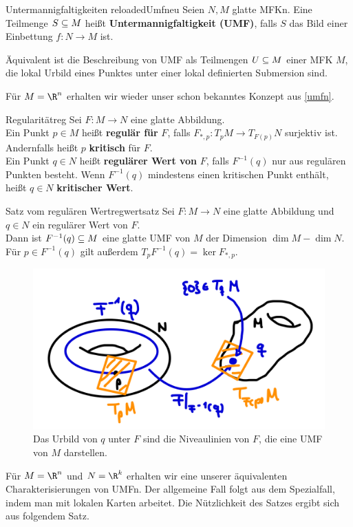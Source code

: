 \begin{definition}{Untermannigfaltigkeiten reloaded}{Umfneu}
Seien $N, M$ glatte MFKn. Eine Teilmenge $S \subseteq M$ heißt \textbf{Untermannigfaltigkeit (UMF)}, falls $S$ das Bild einer Einbettung $f: N \to M$ ist.
\end{definition}
\begin{bemerkung}
Äquivalent ist die Beschreibung von UMF als Teilmengen $U \subseteq M$ einer MFK $M$, die lokal Urbild eines Punktes unter einer lokal definierten Submersion sind.
\end{bemerkung}
Für $M=\R^n$ erhalten wir wieder unser schon bekanntes Konzept aus \ref{umfn}.
\begin{definition}{Regularität}{reg}
Sei $F: M \to N$ eine glatte Abbildung.\\
Ein Punkt $p \in M$ heißt \textbf{regulär für} $F$, falls $F_{\ast, p}: T_pM \to T_{F(p)}N$ surjektiv ist. Andernfalls heißt $p$ \textbf{kritisch} für $F$.\\
Ein Punkt $q \in N$ heißt \textbf{regulärer Wert von} $F$, falls $F^{-1}(q)$ nur aus regulären Punkten besteht. Wenn $F^{-1}(q)$ mindestens einen kritischen Punkt enthält, heißt $q \in N$ \textbf{kritischer Wert}.
\end{definition}
\begin{satz}{Satz vom regulären Wert}{regwertsatz}
Sei $F: M \to N$ eine glatte Abbildung und $q \in N$ ein regulärer Wert von $F$.\\
Dann ist $F^{-1}(q) \subseteq M$ eine glatte UMF von $M$ der Dimension $\dim M - \dim N$. Für $p \in F^{-1}(q)$ gilt außerdem $T_pF^{-1} (q) = \ker F_{\ast, p}$.
\begin{figure}[H]
\label{fig:regulaer}
\centering
\includegraphics[width=0.3\linewidth]{Bilder/regulaer.png}
\caption{Das Urbild von $q$ unter $F$ sind die Niveaulinien von $F$, die eine UMF von $M$ darstellen.}
\end{figure}
\end{satz}
\begin{bemerkung}
Für $M = \R^n$ und $N= \R^k$ erhalten wir eine unserer äquivalenten Charakterisierungen von UMFn. Der allgemeine Fall folgt aus dem Spezialfall, indem man mit lokalen Karten arbeitet. Die Nützlichkeit des Satzes ergibt sich aus folgendem Satz.
\end{bemerkung}
